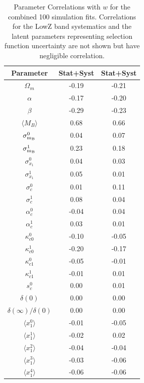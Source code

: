 \documentclass[a4paper,fleqn,usenatbib]{mnras}
\newcommand{\gten}{\citetalias{Guy2010}}
\newcommand{\celeven}{\citetalias{Chotard2011}}
\begin{document}
\begin{table}
	\centering
	\caption{Parameter Correlations with $w$ for the combined 100 simulation fits. Correlations for the LowZ band systematics and the latent parameters representing selection function uncertainty are not shown but have negligible correlation.}
	\label{tab:parameter_correlations}
	\begin{tabular}{c|cc}
		Parameter & {\gten} Stat+Syst & {\celeven} Stat+Syst  \\
		\hline
		$\Omega_m$ &   -0.19 &     -0.21     \\
		$\alpha$ &   -0.17 &     -0.20     \\
		$\beta$ &   -0.29 &     -0.23     \\
		$\langle M_B \rangle$ &    0.68 &      0.66     \\
		$\sigma_{\rm m_B}^{0}$ &    0.04 &      0.07     \\
		$\sigma_{\rm m_B}^{1}$ &    0.23 &      0.18     \\
		$\sigma_{x_1}^{0}$ &    0.04 &      0.03     \\
		$\sigma_{x_1}^{1}$ &    0.05 &      0.01     \\
		$\sigma_{c}^{0}$ &    0.01 &      0.11     \\
		$\sigma_{c}^{1}$ &    0.08 &      0.04     \\
		$\alpha_c^{0}$ &   -0.04 &      0.04     \\
		$\alpha_c^{1}$ &    0.03 &      0.01     \\
		$\kappa_{c0}^{0}$ &   -0.10 &     -0.05     \\
		$\kappa_{c0}^{1}$ &   -0.20 &     -0.17     \\
		$\kappa_{c1}^{0}$ &   -0.05 &     -0.01     \\
		$\kappa_{c1}^{1}$ &   -0.01 &      0.01     \\
		$s_c^{0}$ &    0.00 &      0.01     \\
		$\delta(0)$ &    0.00 &      0.00     \\
		$\delta(\infty)/\delta(0)$ &    0.00 &      0.00     \\
		$\langle x_1^{0} \rangle$ &   -0.01 &     -0.05     \\
		$\langle x_1^{1} \rangle$ &   -0.02 &      0.02     \\
		$\langle x_1^{2} \rangle$ &   -0.04 &     -0.04     \\
		$\langle x_1^{3} \rangle$ &   -0.03 &     -0.06     \\
		$\langle x_1^{4} \rangle$ &   -0.06 &     -0.06     \\

\end{tabular}
\end{table}
\end{document}
